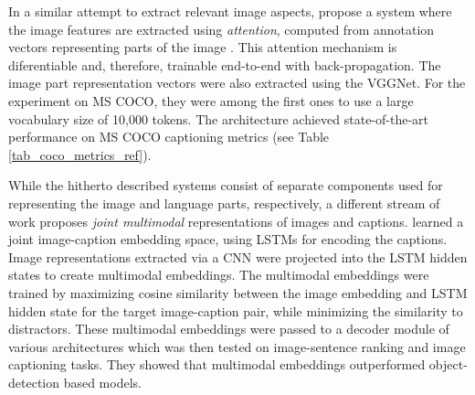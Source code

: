 In a similar attempt to extract relevant image aspects, \cite{xu2015show} propose a system where the image features are extracted using \textit{attention}, computed from annotation vectors representing parts of the image \parencite{bahdanau2014neural}. %
This attention mechanism is diferentiable and, therefore, trainable end-to-end with back-propagation. The image part representation vectors were also extracted using the VGGNet. 
For the experiment on MS COCO, they were among the first ones to use a large vocabulary size of 10,000 tokens. The architecture achieved state-of-the-art performance on MS COCO captioning metrics (see Table \ref{tab_coco_metrics_ref}).%

While the hitherto described systems consist of separate components used for representing the image and language parts, respectively, a different stream of work proposes \textit{joint multimodal} representations of images and captions. \cite{kiros2014unifying} learned a joint image-caption embedding space, using LSTMs for encoding the captions. Image representations extracted via a CNN were projected into the LSTM hidden states to create multimodal embeddings. The multimodal embeddings were trained by maximizing cosine similarity between the image embedding and LSTM hidden state for the target image-caption pair, while minimizing the similarity to distractors. These multimodal embeddings were passed to a decoder module of various architectures which was then tested on image-sentence ranking and image captioning tasks. They showed that multimodal embeddings outperformed object-detection based models.

